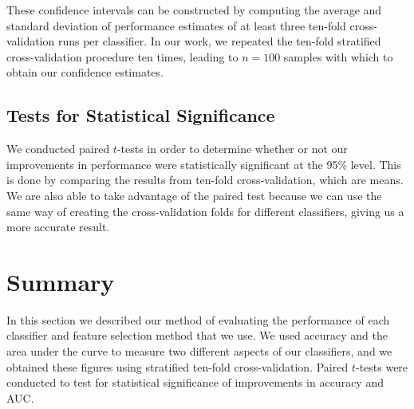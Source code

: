 These confidence intervals can be constructed by computing the average and
standard deviation of performance estimates of at least three ten-fold
cross-validation runs per classifier.
In our work, we repeated the ten-fold stratified cross-validation procedure
ten times, leading to $n=100$ samples with which to obtain our confidence
estimates.

\subsection{Tests for Statistical Significance}
We conducted paired $t$-tests in order to determine whether or not our
improvements in performance were statistically significant at the 95\% level.
This is done by comparing the results from ten-fold cross-validation, which
are means. We are also able to take advantage of the paired test because we
can use the same way of creating the cross-validation folds for different
classifiers, giving us a more accurate result.

\section{Summary}
In this section we described our method of evaluating the performance of each
classifier and feature selection method that we use. We used accuracy and the
area under the curve to measure two different aspects of our classifiers, and
we obtained these figures using stratified ten-fold cross-validation. Paired
$t$-tests were conducted to test for statistical significance of improvements
in accuracy and AUC.
